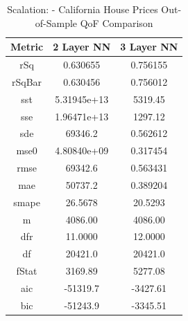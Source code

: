 \documentclass{article}
\begin{document}
\begin{table}[H]
\centering
\caption{Scalation: - California House Prices Out-of-Sample QoF Comparison}
\label{tab:Scalation: - California House Prices Out-of-Sample QoF Comparison}
\begin{tabular}{|c|c|c|} \hline 
Metric & 2 Layer NN & 3 Layer NN \\ \hline \hline 
rSq & 0.630655 & 0.756155 \\ \hline 
rSqBar & 0.630456 & 0.756012 \\ \hline 
sst & 5.31945e+13 & 5319.45 \\ \hline 
sse & 1.96471e+13 & 1297.12 \\ \hline 
sde & 69346.2 & 0.562612 \\ \hline 
mse0 & 4.80840e+09 & 0.317454 \\ \hline 
rmse & 69342.6 & 0.563431 \\ \hline 
mae & 50737.2 & 0.389204 \\ \hline 
smape & 26.5678 & 20.5293 \\ \hline 
m & 4086.00 & 4086.00 \\ \hline 
dfr & 11.0000 & 12.0000 \\ \hline 
df & 20421.0 & 20421.0 \\ \hline 
fStat & 3169.89 & 5277.08 \\ \hline 
aic & -51319.7 & -3427.61 \\ \hline 
bic & -51243.9 & -3345.51 \\ \hline 
\end{tabular}
\end{table}
\end{document}
